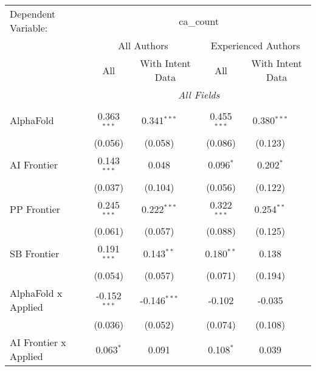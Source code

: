 \begingroup
\centering
\begin{tabular}{lcccccc}
   \tabularnewline \midrule \midrule
   Dependent Variable: & \multicolumn{6}{c}{ca\_count}\\
 & \multicolumn{3}{c}{All Authors} & \multicolumn{3}{c}{Experienced Authors} \\
\cmidrule(lr){2-4} \cmidrule(lr){5-7}
 & \multicolumn{1}{c}{All} & \multicolumn{2}{c}{With Intent Data} & \multicolumn{1}{c}{All} & \multicolumn{2}{c}{With Intent Data} \\
\cmidrule(lr){2-2} \cmidrule(lr){3-4} \cmidrule(lr){5-5} \cmidrule(lr){6-7}
 & \multicolumn{6}{c}{\textit{All Fields}} \\ \\
   AlphaFold                      & 0.363$^{***}$  & 0.341$^{***}$  &                & 0.455$^{***}$  & 0.380$^{***}$ &   \\   
                                  & (0.056)        & (0.058)        &                & (0.086)        & (0.123)       &   \\   
   AI Frontier                    & 0.143$^{***}$  & 0.048          &                & 0.096$^{*}$    & 0.202$^{*}$   &   \\   
                                  & (0.037)        & (0.104)        &                & (0.056)        & (0.122)       &   \\   
   PP Frontier                    & 0.245$^{***}$  & 0.222$^{***}$  &                & 0.322$^{***}$  & 0.254$^{**}$  &   \\   
                                  & (0.061)        & (0.057)        &                & (0.088)        & (0.125)       &   \\   
   SB Frontier                    & 0.191$^{***}$  & 0.143$^{**}$   &                & 0.180$^{**}$   & 0.138         &   \\   
                                  & (0.054)        & (0.057)        &                & (0.071)        & (0.194)       &   \\   
   AlphaFold x Applied            & -0.152$^{***}$ & -0.146$^{***}$ &                & -0.102         & -0.035        &   \\   
                                  & (0.036)        & (0.052)        &                & (0.074)        & (0.108)       &   \\   
   AI Frontier x Applied          & 0.063$^{*}$    & 0.091          &                & 0.108$^{*}$    & 0.039         &   \\   

\end{tabular}

